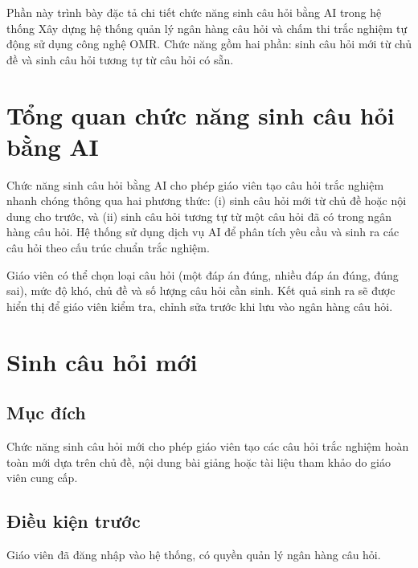 ﻿\documentclass[../DoAn.tex]{subfiles}
\begin{document}
Phần này trình bày đặc tả chi tiết chức năng sinh câu hỏi bằng AI trong hệ thống Xây dựng hệ thống quản lý ngân hàng câu hỏi và chấm thi trắc nghiệm tự động sử dụng công nghệ OMR. Chức năng gồm hai phần: sinh câu hỏi mới từ chủ đề và sinh câu hỏi tương tự từ câu hỏi có sẵn.

\section{Tổng quan chức năng sinh câu hỏi bằng AI}

Chức năng sinh câu hỏi bằng AI cho phép giáo viên tạo câu hỏi trắc nghiệm nhanh chóng thông qua hai phương thức: (i) sinh câu hỏi mới từ chủ đề hoặc nội dung cho trước, và (ii) sinh câu hỏi tương tự từ một câu hỏi đã có trong ngân hàng câu hỏi. Hệ thống sử dụng dịch vụ AI để phân tích yêu cầu và sinh ra các câu hỏi theo cấu trúc chuẩn trắc nghiệm.

Giáo viên có thể chọn loại câu hỏi (một đáp án đúng, nhiều đáp án đúng, đúng sai), mức độ khó, chủ đề và số lượng câu hỏi cần sinh. Kết quả sinh ra sẽ được hiển thị để giáo viên kiểm tra, chỉnh sửa trước khi lưu vào ngân hàng câu hỏi.

\section{Sinh câu hỏi mới}

\subsection{Mục đích}
Chức năng sinh câu hỏi mới cho phép giáo viên tạo các câu hỏi trắc nghiệm hoàn toàn mới dựa trên chủ đề, nội dung bài giảng hoặc tài liệu tham khảo do giáo viên cung cấp.

\subsection{Điều kiện trước}
Giáo viên đã đăng nhập vào hệ thống, có quyền quản lý ngân hàng câu hỏi.
\end{document}
